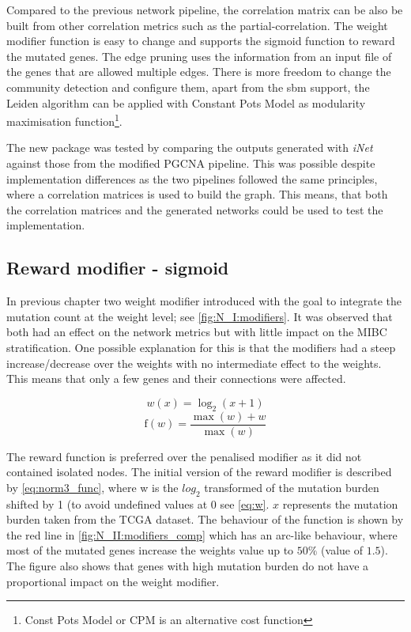 Compared to the previous network pipeline, the correlation matrix can be also be built from other correlation metrics such as the partial-correlation. The weight modifier function is easy to change and supports the sigmoid function to reward the mutated genes. The edge pruning uses the information from an input file of the genes that are allowed multiple edges. There is more freedom to change the community detection and configure them, apart from the \acrfull{sbm} support, the Leiden algorithm can be applied with Constant Pots Model as modularity maximisation function\footnote{Const Pots Model or CPM is an alternative cost function}.

The new package was tested by comparing the outputs generated with \textit{iNet} against those from the modified PGCNA pipeline. This was possible despite implementation differences as the two pipelines followed the same principles, where a correlation matrices is used to build the graph. This means, that both the correlation matrices and the generated networks could be used to test the implementation.

\subsection*{Reward modifier - sigmoid} \label{s:N_II:reward}

In previous chapter two weight modifier introduced with the goal to integrate the mutation count at the weight level; see \cref{fig:N_I:modifiers}. It was observed that both had an effect on the network metrics but with little impact on the MIBC stratification. One possible explanation for this is that the modifiers had a steep increase/decrease over the weights with no intermediate effect to the weights. This means that only a few genes and their connections were affected.

\begin{equation} \label{eq:w}
    w(x) = \log_2(x+1)
\end{equation}
\begin{equation} \label{eq:norm3_func}
\text{f}(w) = \frac{\max(w) + w}{\max(w)}
\end{equation}

The reward function is preferred over the penalised modifier as it did not contained isolated nodes. The initial version of the reward modifier is described by \cref{eq:norm3_func}, where w is the $log_2$ transformed of the mutation burden shifted by 1 (to avoid undefined values at 0 see \cref{eq:w}. $x$ represents the mutation burden taken from the TCGA dataset.  The behaviour of the function is shown by the red line in \cref{fig:N_II:modifiers_comp} which has an arc-like behaviour, where most of the mutated genes increase the weights value up to $50\%$ (value of $1.5$). The figure also shows that genes with high mutation burden do not have a proportional impact on the weight modifier.

